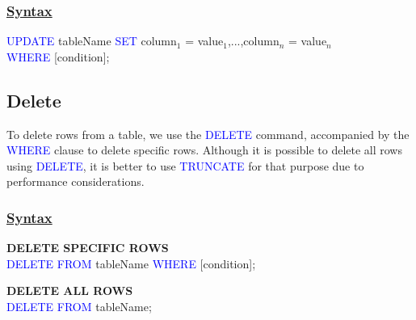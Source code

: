 \subsubsection*{\underline{\textbf{Syntax}}}
\begin{tcolorbox}[title = Update]
\textcolor{blue}{UPDATE} tableName \textcolor{blue}{SET} column$_{1}$ = value$_{1}$,...,column$_{n}$ = value$_{n}$\\
\textcolor{blue}{WHERE} {[condition]};
\end{tcolorbox}

\subsection{Delete} 
\begin{tcolorbox}[title = Definition]
To delete rows from a table, we use the \textcolor{blue}{DELETE} command, accompanied by the \textcolor{blue}{WHERE} clause to delete specific rows. Although it is possible to delete all rows using \textcolor{blue}{DELETE}, it is better to use \textcolor{blue}{TRUNCATE} for that purpose due to performance considerations.
\end{tcolorbox}

\subsubsection*{\underline{\textbf{Syntax}}}
\begin{tcolorbox}[title = Delete]
\textbf{DELETE SPECIFIC ROWS}\\
\textcolor{blue}{DELETE FROM} tableName \textcolor{blue}{WHERE} {[condition]};

\textbf{DELETE ALL ROWS}\\
\textcolor{blue}{DELETE FROM} tableName;
\end{tcolorbox}

